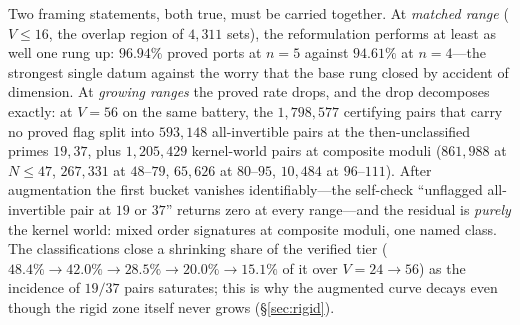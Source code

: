 \begin{center}
\end{center}

Two framing statements, both true, must be carried together. At
\emph{matched range} ($V\le 16$, the overlap region of $4{,}311$ sets),
the reformulation performs at least as well one rung up: $96.94\%$ proved
ports at $n=5$ against $94.61\%$ at $n=4$---the strongest single datum
against the worry that the base rung closed by accident of dimension. At
\emph{growing ranges} the proved rate drops, and the drop decomposes
exactly: at $V=56$ on the same battery, the $1{,}798{,}577$ certifying
pairs that carry no proved flag split into $593{,}148$
all-invertible pairs at the then-unclassified primes $19,37$, plus
$1{,}205{,}429$ kernel-world pairs at composite moduli
($861{,}988$ at $N\le47$, $267{,}331$ at $48$--$79$, $65{,}626$ at
$80$--$95$, $10{,}484$ at $96$--$111$). After augmentation the first bucket vanishes
identifiably---the self-check ``unflagged all-invertible pair at $19$ or
$37$'' returns zero at every range---and the residual is \emph{purely}
the kernel world: mixed order signatures at composite moduli, one named
class. The classifications close a shrinking share of the verified tier
($48.4\%\to42.0\%\to28.5\%\to20.0\%\to15.1\%$ of it over $V=24\to56$) as the
incidence of $19/37$ pairs saturates; this is why the augmented curve
decays even though the rigid zone itself never grows
(\S\ref{sec:rigid}).

